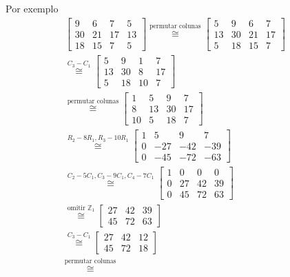 \documentclass[a4paper,portuguese,11pt,twoside, leqno]{book}
\theoremstyle{definition}
\begin{document}
	\par\vspace{0.3cm} Por exemplo
	\begin{align*}
	\begin{bmatrix}
	9 & 6 & 7 & 5 \\
	30 & 21 & 17 & 13 \\
	18 & 15 & 7 & 5
	\end{bmatrix} \stackrel{\text{permutar colunas}}{\cong} 
	\begin{bmatrix}
	5 & 9 & 6 & 7 \\
	13 & 30 & 21 & 17 \\
	5 & 18 & 15 & 7
	\end{bmatrix}& \\ \stackrel{C_3 - C_1}{\cong}
	\begin{bmatrix}
	5 & 9 & 1 & 7 \\
	13 & 30 & 8 & 17 \\
	5 & 18 & 10 & 7
	\end{bmatrix}& \\ \stackrel{\text{permutar colunas}}{\cong}
	\begin{bmatrix}
	1 & 5 & 9 & 7 \\
	8 & 13 & 30 & 17 \\
	10 & 5 & 18 & 7
	\end{bmatrix}& \\ \stackrel{R_2 - 8R_1, R_3 - 10R_1}{\cong}
	\begin{bmatrix}
	1 & 5 & 9 & 7 \\
	0 & -27 & -42 & -39 \\
	0 & -45 & -72 & -63 
	\end{bmatrix}& \\ \stackrel{C_2 - 5C_1, C_3 - 9C_1, C_4 - 7C_1}{\cong} 
	\begin{bmatrix}
	1 & 0 & 0 & 0 \\
	0 & 27 & 42 & 39 \\
	0 & 45 & 72 & 63
	\end{bmatrix}& \\ \stackrel{\text{omitir }\mathbb{Z}_1}{\cong}
	\begin{bmatrix}
	27 & 42 & 39 \\
	45 & 72 & 63
	\end{bmatrix}& \\ \stackrel{C_3 - C_1}{\cong}
	\begin{bmatrix}
	27 & 42 & 12 \\
	45 & 72 & 18
	\end{bmatrix}& \\ \stackrel{\text{permutar colunas}}{\cong}

\end{align*}
\end{document}
